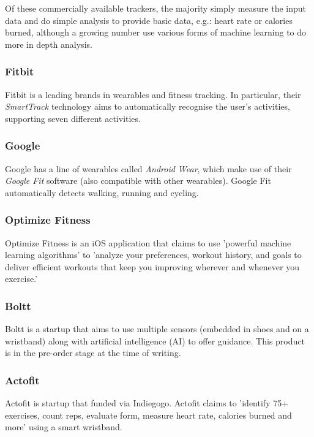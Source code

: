 \documentclass[a4paper]{article}
\begin{document}
Of these commercially available trackers, the majority simply measure the input data and do simple analysis to provide basic data, e.g.: heart rate or calories burned, although a growing number use various forms of machine learning to do more in depth analysis. 

\subsubsection{Fitbit}

Fitbit is a leading brands in wearables and fitness tracking. In particular, their \textit{SmartTrack}\cite{bgref8} technology aims to automatically recognise the user's activities, supporting seven different activities.

\subsubsection{Google}

Google has a line of wearables called \textit{Android Wear}\cite{bgref9}, which make use of their \textit{Google Fit}\cite{bgref10} software (also compatible with other wearables).
Google Fit automatically detects walking, running and cycling.

\subsubsection{Optimize Fitness}

Optimize Fitness\cite{bgref11} is an iOS application that claims to use 'powerful machine learning algorithms' to 'analyze your preferences, workout history, and goals to deliver efficient workouts that keep you improving wherever and whenever you exercise.'

\subsubsection{Boltt}

Boltt\cite{bgref12} is a startup that aims to use multiple sensors (embedded in shoes and on a wristband) along with artificial intelligence (AI) to offer guidance. This product is in the pre-order stage at the time of writing.

\subsubsection{Actofit}

Actofit\cite{bgref13} is startup that funded via Indiegogo\cite{bgref14}. Actofit claims to 'identify 75+ exercises, count reps, evaluate form, measure heart rate, calories burned and more' using a smart wristband.
\end{document}

